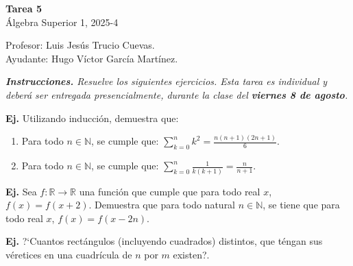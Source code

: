 \documentclass[letterpaper,DIV=14,headsepline,12pt]{scrartcl}
\newcounter{Ejer}
\newcommand{\pts}{}
\newenvironment{ejercicio}[1]{\noindent
    \ifthenelse{\equal{#1}{1}}{\renewcommand{\pts}{\textbf{(#1 pt)}}}{\renewcommand{\pts}{\textbf{(#1 pts)}}}\textbf{Ej. \theEjer} \pts\stepcounter{Ejer}}{\vspace{.3cm}}
\begin{document}
    \begin{center}
        {\fontsize{30}{60}\rmfamily \textbf{Tarea 5}} \\ \vspace{.2cm}
        Álgebra Superior 1, 2025-4
    \end{center}
    \begin{flushright}
        \footnotesize \hfill Profesor: Luis Jesús Trucio Cuevas.\\
        \hfill Ayudante: Hugo Víctor García Martínez.
    \end{flushright}

    \noindent\textit{\textbf{Instrucciones.} Resuelve los siguientes ejercicios. Esta tarea es individual y deberá ser entregada presencialmente, durante la clase del \textbf{viernes 8 de agosto}.}\vspace{.4cm}

    \begin{ejercicio}{2}
        Utilizando inducción, demuestra que:
        \begin{enumerate}
            \item Para todo $n \in \mathbb{N}$, se cumple que: $\displaystyle \sum_{k=0}^{n} k^2 = \frac{n(n+1)(2n+1)}{6}$.
            \item Para todo $n \in \mathbb{N}$, se cumple que: $\displaystyle \sum_{k=0}^{n} \frac{1}{k(k+1)} = \frac{n}{n+1}$.
        \end{enumerate}
    \end{ejercicio}

    \begin{ejercicio}{3}
        Sea $f:\mathbb{R} \to \mathbb{R}$ una función que cumple que para todo real $x$, $f(x)=f(x+2)$. Demuestra que para todo natural $n \in \mathbb{N}$, se tiene que para todo real $x$, $f(x)=f(x-2n)$.
    \end{ejercicio}

    \begin{ejercicio}{1}
        ?`Cuantos rectángulos (incluyendo cuadrados) distintos, que téngan sus véretices en una cuadrícula de $n$ por $m$ existen?.
        \begin{center}
        \end{center}
    \end{ejercicio}
\end{document}
